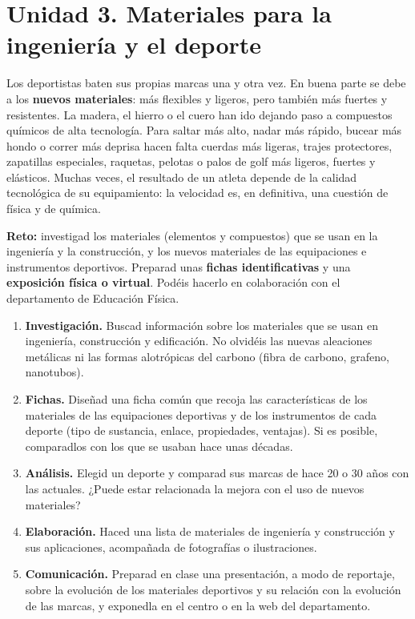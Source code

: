 \section{Unidad 3. Materiales para la ingeniería y el deporte}

Los deportistas baten sus propias marcas una y otra vez. En buena parte se debe a los \textbf{nuevos materiales}: más flexibles y ligeros, pero también más fuertes y resistentes. La madera, el hierro o el cuero han ido dejando paso a compuestos químicos de alta tecnología. Para saltar más alto, nadar más rápido, bucear más hondo o correr más deprisa hacen falta cuerdas más ligeras, trajes protectores, zapatillas especiales, raquetas, pelotas o palos de golf más ligeros, fuertes y elásticos. Muchas veces, el resultado de un atleta depende de la calidad tecnológica de su equipamiento: la velocidad es, en definitiva, una cuestión de física y de química.

\begin{marker}
    \textbf{Reto:} investigad los materiales (elementos y compuestos) que se usan en la ingeniería y la construcción, y los nuevos materiales de las equipaciones e instrumentos deportivos. Preparad unas \textbf{fichas identificativas} y una \textbf{exposición física o virtual}. Podéis hacerlo en colaboración con el departamento de Educación Física.
\end{marker}

\begin{enumerate}[label=\numberballred]
    \item \textbf{Investigación.} Buscad información sobre los materiales que se usan en ingeniería, construcción y edificación. No olvidéis las nuevas aleaciones metálicas ni las formas alotrópicas del carbono (fibra de carbono, grafeno, nanotubos).
    \item \textbf{Fichas.} Diseñad una ficha común que recoja las características de los materiales de las equipaciones deportivas y de los instrumentos de cada deporte (tipo de sustancia, enlace, propiedades, ventajas). Si es posible, comparadlos con los que se usaban hace unas décadas.
    \item \textbf{Análisis.} Elegid un deporte y comparad sus marcas de hace 20 o 30 años con las actuales. ¿Puede estar relacionada la mejora con el uso de nuevos materiales?
    \item \textbf{Elaboración.} Haced una lista de materiales de ingeniería y construcción y sus aplicaciones, acompañada de fotografías o ilustraciones.
    \item \textbf{Comunicación.} Preparad en clase una presentación, a modo de reportaje, sobre la evolución de los materiales deportivos y su relación con la evolución de las marcas, y exponedla en el centro o en la web del departamento.
\end{enumerate}

